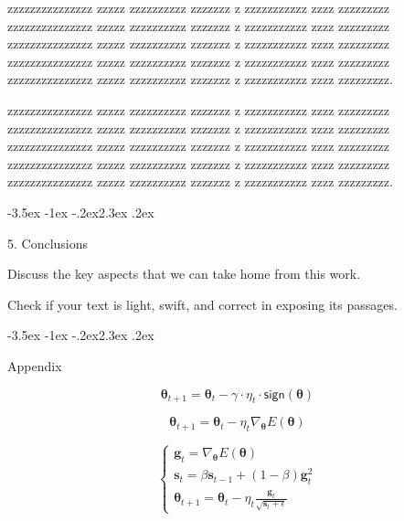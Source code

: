 \documentclass[prl,twocolumn]{revtex4-1}
\makeatletter
\renewcommand{\section}{\@startsection{section}{1}{\z@}%
	{-3.5ex \@plus -1ex \@minus -.2ex}{2.3ex \@plus.2ex}%
	{\normalfont\bfseries\raggedright}}
\makeatother
\begin{document}
  zzzzzzzzzzzzzzz zzzzz zzzzzzzzzz zzzzzzz z zzzzzzzzzzz zzzz zzzzzzzzz
  zzzzzzzzzzzzzzz zzzzz zzzzzzzzzz zzzzzzz z zzzzzzzzzzz zzzz zzzzzzzzz
  zzzzzzzzzzzzzzz zzzzz zzzzzzzzzz zzzzzzz z zzzzzzzzzzz zzzz zzzzzzzzz
  zzzzzzzzzzzzzzz zzzzz zzzzzzzzzz zzzzzzz z zzzzzzzzzzz zzzz zzzzzzzzz
  zzzzzzzzzzzzzzz zzzzz zzzzzzzzzz zzzzzzz z zzzzzzzzzzz zzzz zzzzzzzzz.

  


  zzzzzzzzzzzzzzz zzzzz zzzzzzzzzz zzzzzzz z zzzzzzzzzzz zzzz zzzzzzzzz
  zzzzzzzzzzzzzzz zzzzz zzzzzzzzzz zzzzzzz z zzzzzzzzzzz zzzz zzzzzzzzz
  zzzzzzzzzzzzzzz zzzzz zzzzzzzzzz zzzzzzz z zzzzzzzzzzz zzzz zzzzzzzzz
  zzzzzzzzzzzzzzz zzzzz zzzzzzzzzz zzzzzzz z zzzzzzzzzzz zzzz zzzzzzzzz
  zzzzzzzzzzzzzzz zzzzz zzzzzzzzzz zzzzzzz z zzzzzzzzzzz zzzz zzzzzzzzz.

\section{5. Conclusions}

Discuss the key aspects that we can take home from this work.

Check if your text is light, swift, and correct in exposing its passages.


\section{Appendix}

\begin{equation}
	\boldsymbol{\theta}_{t+1}=\boldsymbol{\theta}_t-\gamma\cdot{\eta_t}\cdot{\mathsf{sign}(\boldsymbol{\theta})}
	\label{eq:regu}
\end{equation}

\begin{equation}
	\boldsymbol{\theta}_{t+1}=\boldsymbol{\theta}_t-\eta_t\nabla_{\boldsymbol{\theta}}{E(\boldsymbol{\theta})}
	\label{eq:sgd}
\end{equation}


\begin{equation}
	\begin{cases}
		\boldsymbol{g}_t=\nabla_{\boldsymbol{\theta}}{E(\boldsymbol{\theta})} \\
		\boldsymbol{s}_t=\beta{\boldsymbol{s}_{t-1}}+(1-\beta)\boldsymbol{g}_t^2 \\
		\boldsymbol{\theta}_{t+1}=\boldsymbol{\theta}_t-\eta_t\frac{\boldsymbol{g}_t}{\sqrt{\boldsymbol{s}_t+\epsilon}}
	\end{cases}
	\label{eq:rmsprop}
\end{equation}
\end{document}
